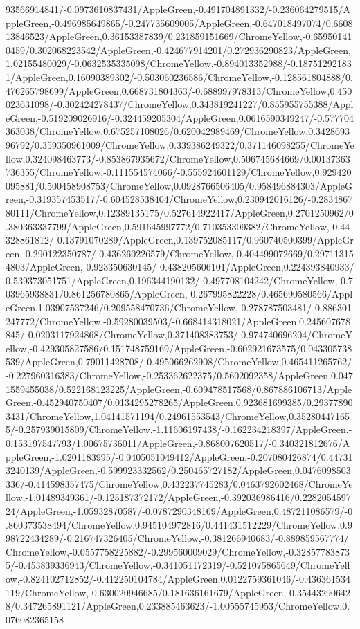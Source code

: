 {\begin{tikzternal}
93566914841/-0.0973610837431/AppleGreen,-0.491704891332/-0.236064279515/AppleGreen,-0.496985649865/-0.247735609005/AppleGreen,-0.647018497074/0.660813846523/AppleGreen,0.36153387839/0.231859151669/ChromeYellow,-0.659501410459/0.302068223542/AppleGreen,-0.424677914201/0.272936290823/AppleGreen,1.02155480029/-0.0632535335098/ChromeYellow,-0.894013352988/-0.187512921831/AppleGreen,0.16090389302/-0.503060236586/ChromeYellow,-0.128561804888/0.476265798699/AppleGreen,0.668731804363/-0.688997978313/ChromeYellow,0.450023631098/-0.302424278437/ChromeYellow,0.343819241227/0.855955755388/AppleGreen,-0.519209026916/-0.324459205304/AppleGreen,0.0616590349247/-0.577704363038/ChromeYellow,0.675257108026/0.620042989469/ChromeYellow,0.342869396792/0.359350961009/ChromeYellow,0.339386249322/0.371146098255/ChromeYellow,0.324098463773/-0.853867935672/ChromeYellow,0.506745684669/0.00137363736355/ChromeYellow,-0.111554574066/-0.555924601129/ChromeYellow,0.929420095881/0.500458908753/ChromeYellow,0.0928766506405/0.958496884303/AppleGreen,-0.319357453517/-0.604528538404/ChromeYellow,0.230942016126/-0.283486780111/ChromeYellow,0.12389135175/0.527614922417/AppleGreen,0.2701250962/0.380363337799/AppleGreen,0.591645997772/0.710353309382/ChromeYellow,-0.44328861812/-0.13791070289/AppleGreen,0.139752085117/0.960740500399/AppleGreen,-0.290122350787/-0.436260226579/ChromeYellow,-0.404499072669/0.297113154803/AppleGreen,-0.923350630145/-0.438205606101/AppleGreen,0.224393840933/0.539373051751/AppleGreen,0.196344190132/-0.497708104242/ChromeYellow,-0.703965938831/0.861256780865/AppleGreen,-0.267995822228/0.465690580566/AppleGreen,1.03907537246/0.209558470736/ChromeYellow,-0.278787503481/-0.886301247772/ChromeYellow,-0.59280039503/-0.668414318021/AppleGreen,0.245607678845/-0.0203117924868/ChromeYellow,0.371408383753/-0.974740696204/ChromeYellow,-0.429305827586/0.151748759169/AppleGreen,-0.602921673575/0.043305738539/AppleGreen,0.79011428708/-0.495066262908/ChromeYellow,0.465411265762/-0.227960316383/ChromeYellow,-0.253362622375/0.5602092358/AppleGreen,0.0471559455038/0.522168123225/AppleGreen,-0.609478517568/0.867886106713/AppleGreen,-0.452940750407/0.0134295278265/AppleGreen,0.923681699385/0.293778903431/ChromeYellow,1.04141571194/0.24961553543/ChromeYellow,0.352804471655/-0.257939015809/ChromeYellow,-1.11606197438/-0.162234218397/AppleGreen,-0.153197547793/1.00675736011/AppleGreen,-0.868007620517/-0.340321812676/AppleGreen,-1.0201183995/-0.0405051049412/AppleGreen,-0.207080426874/0.447313240139/AppleGreen,-0.599923332562/0.250465727182/AppleGreen,0.0476098503336/-0.414598357475/ChromeYellow,0.432237745283/0.0463792602468/ChromeYellow,-1.01489349361/-0.125187372172/AppleGreen,-0.392036986416/0.228205459724/AppleGreen,-1.05932870587/-0.0787290348169/AppleGreen,0.487211086579/-0.860373538494/ChromeYellow,0.945104972816/0.441431512229/ChromeYellow,0.998722434289/-0.216747326405/ChromeYellow,-0.381266940683/-0.889859567774/ChromeYellow,-0.0557758225882/-0.299560009029/ChromeYellow,-0.328577838735/-0.453839336943/ChromeYellow,-0.341051172319/-0.521075865649/ChromeYellow,-0.824102712852/-0.412250104784/AppleGreen,0.0122759361046/-0.436361534119/ChromeYellow,-0.630020946685/0.181636161679/AppleGreen,-0.354432906428/0.347265891121/AppleGreen,0.233885463623/-1.00555745953/ChromeYellow,0.076082365158
\end{tikzternal}}
